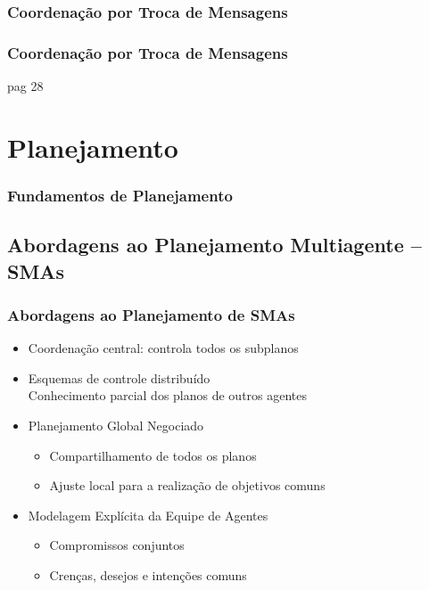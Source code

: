 \subsubsection{Coordenação por Troca de Mensagens}

\begin{frame}
\frametitle{Coordenação por Troca de Mensagens}

pag 28


\end{frame}

\section{Planejamento}


\begin{frame}
\frametitle{Fundamentos de Planejamento}



\end{frame}


\subsection{Abordagens ao Planejamento Multiagente -- SMAs}

\begin{frame}
\frametitle{Abordagens ao Planejamento de SMAs}

\begin{block}{}
 
\begin{itemize}
  \item Coordenação central: controla todos os subplanos
  \item Esquemas de controle distribuído\\
        Conhecimento parcial dos planos de outros agentes
  \item Planejamento Global Negociado

\begin{itemize}
  \item Compartilhamento de todos os planos
  \item Ajuste local para a realização de objetivos comuns

\end{itemize}

\item Modelagem Explícita da Equipe de Agentes
\begin{itemize}
  \item Compromissos conjuntos
   \item Crenças, desejos e intenções comuns

\end{itemize}
\end{itemize}
\end{block}

\end{frame}

